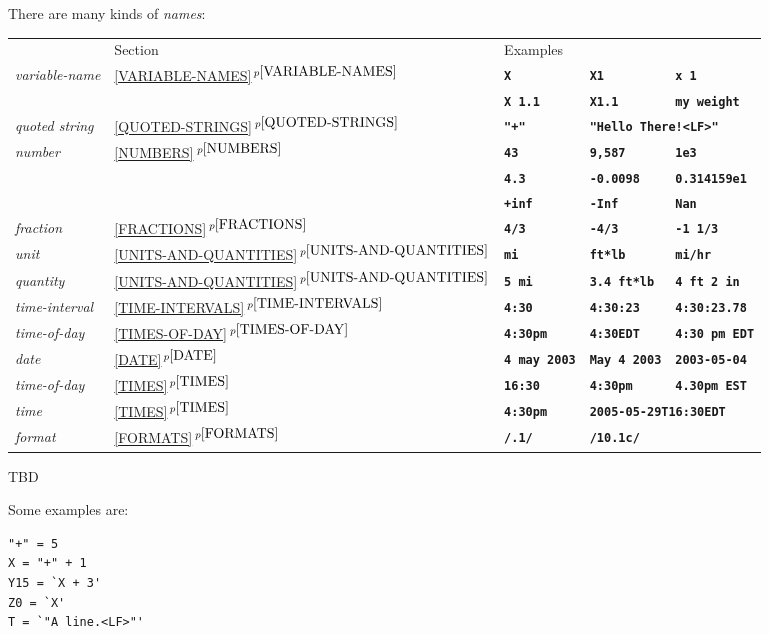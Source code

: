 \documentclass[12pt]{article}
\newcommand{\TT}[1]{{\tt \bfseries #1}}
\newcommand{\itemref}[1]{\ref{#1}$\,^{p\pageref{#1}}$}
\newenvironment{indpar}[1][0.3in]%
	{\begin{list}{}%
		     {\setlength{\itemsep}{0in}%
		      \setlength{\topsep}{0in}%
		      \setlength{\parsep}{1ex}%
		      \setlength{\labelwidth}{#1}%
		      \setlength{\leftmargin}{#1}%
		      \addtolength{\leftmargin}{\labelsep}}%
	 \item}%
	{\end{list}}
\begin{document}
There are many kinds of {\em names}:
\begin{indpar}
    \begin{tabular}[t]{l@{~~~~~}llll}
          & Section & Examples \\[1ex]
      {\em variable-name}
    & \itemref{VARIABLE-NAMES}
    & \TT{X} & \TT{X1} & \TT{x 1} \\
    &
    & \TT{X 1.1} & \TT{X1.1} & \TT{my weight} \\
      {\em quoted string}
    & \itemref{QUOTED-STRINGS}
    & \TT{"+"} & \multicolumn{2}{l}{\TT{"Hello There!<LF>"}} \\
      {\em number}
    & \itemref{NUMBERS}
    & \TT{43} & \TT{9,587} & \TT{1e3} \\
    & 
    & \TT{4.3} & \TT{-0.0098} & \TT{0.314159e1} \\
    & 
    & \TT{+inf} & \TT{-Inf} & \TT{Nan} \\
      {\em fraction}
    & \itemref{FRACTIONS}
    & \TT{4/3} & \TT{-4/3} & \TT{-1 1/3} \\
      {\em unit}
    & \itemref{UNITS-AND-QUANTITIES}
    & \TT{mi} & \TT{ft*lb} & \TT{mi/hr} \\
      {\em quantity}
    & \itemref{UNITS-AND-QUANTITIES}
    & \TT{5 mi} & \TT{3.4 ft*lb} & \TT{4 ft 2 in} \\
      {\em time-interval}
    & \itemref{TIME-INTERVALS}
    & \TT{4:30} & \TT{4:30:23} & \TT{4:30:23.78} \\
      {\em time-of-day}
    & \itemref{TIMES-OF-DAY}
    & \TT{4:30pm} & \TT{4:30EDT} & \TT{4:30 pm EDT} \\
      {\em date}
    & \itemref{DATE}
    & \TT{4 may 2003} & \TT{May 4 2003} & \TT{2003-05-04} \\
      {\em time-of-day}
    & \itemref{TIMES}
    & \TT{16:30} & \TT{4:30pm} & \TT{4.30pm EST} \\
      {\em time}
    & \itemref{TIMES}
    & \TT{4:30pm} & \multicolumn{2}{l}{\TT{2005-05-29T16:30EDT}} \\
      {\em format}
    & \itemref{FORMATS}
    & \TT{/.1/} & \TT{/10.1c/} \\

    \end{tabular}
\end{indpar}

TBD

Some examples are:

\begin{indpar}\begin{verbatim}
"+" = 5
X = "+" + 1
Y15 = `X + 3' 
Z0 = `X'
T = `"A line.<LF>"'
\end{verbatim}\end{indpar}
\end{document}
